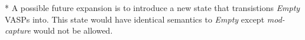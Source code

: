 \vspace{2em}

* A possible future expansion is to introduce a new state that
 transistions {\em Empty} VASPs into.  This state
would have identical semantics to {\em Empty} except {\em mod-capture} would not
be allowed.

